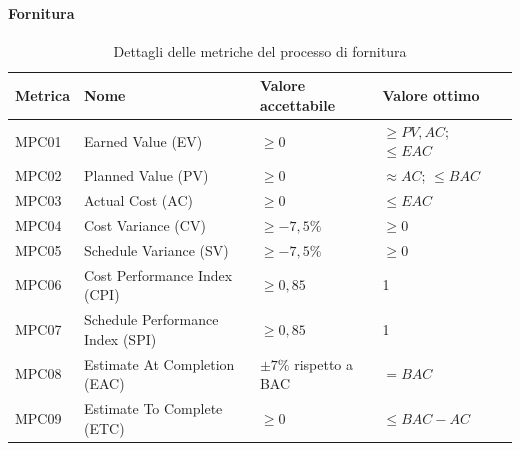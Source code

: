 \documentclass[a4paper,12pt]{article}
\begin{document}
{{{            \paragraph{Fornitura}
            \leavevmode
                \begin{table}[H]
                \centering
                    \begin{tabular}{|l|l|l|l|l|}
                        \hline
                        \rowcolor{gold}
                        \textbf{Metrica} & \textbf{Nome} & \textbf{Valore accettabile} & \textbf{Valore ottimo} \\
                        \hline
                        MPC01 & Earned Value (EV) & $\ge 0$ & $\ge PV, AC$; $\le EAC$\\
                        \hline
                        MPC02 & Planned Value (PV) & $\ge 0$ & $\approx AC$; $\le BAC$ \\
                        \hline
                        MPC03 & Actual Cost (AC) & $\ge 0$ & $\le EAC$ \\
                        \hline
                        MPC04 & Cost Variance (CV) & $\ge -7,5\%$ & $\ge 0$ \\
                        \hline
                        MPC05 & Schedule Variance (SV) & $\ge -7,5\%$ & $\ge 0$ \\
                        \hline
                        MPC06 & Cost Performance Index (CPI) & $\ge 0,85$ & 1 \\
                        \hline
                        MPC07 & Schedule Performance Index (SPI) & $\ge 0,85$ & 1 \\
                        \hline
                        MPC08 & Estimate At Completion (EAC) & $\pm7\%$ rispetto a BAC & $= BAC$ \\
                        \hline
                        MPC09 & Estimate To Complete (ETC) & $\ge 0$ & $\le BAC-AC$ \\
                        \hline
                    \end{tabular}
                    \caption{Dettagli delle metriche del processo di fornitura} 
                    \label{tab:metriche-fornitura}
                \end{table}
            

}}}
\end{document}

